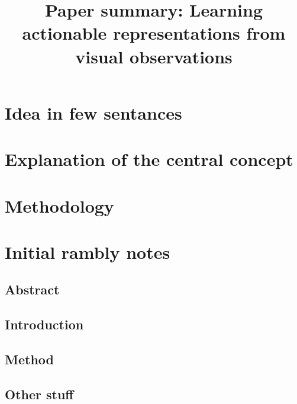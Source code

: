 \documentclass{article}
\title{Paper summary: Learning actionable representations from visual observations}
\begin{document}
\maketitle


\section{Idea in few sentances}

\section{Explanation of the central concept}


\section{Methodology}


\section{Initial rambly notes}


\subsection{Abstract}



\subsection{Introduction}

\subsection{Method}

\subsection{Other stuff}
\end{document}
